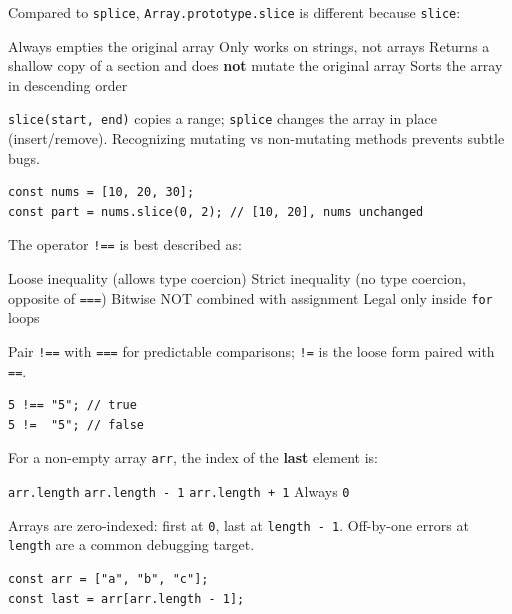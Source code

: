 \question[4]
Compared to \texttt{splice}, \texttt{Array.prototype.slice} is different because \texttt{slice}:
\begin{choices}
  \choice Always empties the original array
  \choice Only works on strings, not arrays
  \CorrectChoice Returns a shallow copy of a section and does \textbf{not} mutate the original array
  \choice Sorts the array in descending order
\end{choices}
\begin{solution}
  \texttt{slice(start, end)} copies a range; \texttt{splice} changes the array in place (insert/remove). Recognizing mutating vs non-mutating methods prevents subtle bugs.
\begin{lstlisting}[style=jsexam]
const nums = [10, 20, 30];
const part = nums.slice(0, 2); // [10, 20], nums unchanged
\end{lstlisting}
\end{solution}

\question[4]
The operator \texttt{!==} is best described as:
\begin{choices}
  \choice Loose inequality (allows type coercion)
  \CorrectChoice Strict inequality (no type coercion, opposite of \texttt{===})
  \choice Bitwise NOT combined with assignment
  \choice Legal only inside \texttt{for} loops
\end{choices}
\begin{solution}
  Pair \texttt{!==} with \texttt{===} for predictable comparisons; \texttt{!=} is the loose form paired with \texttt{==}.
\begin{lstlisting}[style=jsexam]
5 !== "5"; // true
5 !=  "5"; // false
\end{lstlisting}
\end{solution}

\question[4]
For a non-empty array \texttt{arr}, the index of the \textbf{last} element is:
\begin{choices}
  \choice \texttt{arr.length}
  \CorrectChoice \texttt{arr.length - 1}
  \choice \texttt{arr.length + 1}
  \choice Always \texttt{0}
\end{choices}
\begin{solution}
  Arrays are zero-indexed: first at \texttt{0}, last at \texttt{length - 1}. Off-by-one errors at \texttt{length} are a common debugging target.
\begin{lstlisting}[style=jsexam]
const arr = ["a", "b", "c"];
const last = arr[arr.length - 1];
\end{lstlisting}
\end{solution}

